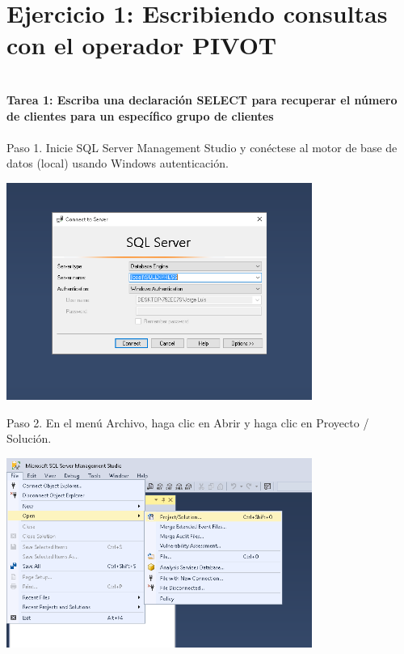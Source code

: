 \section{Ejercicio 1: Escribiendo consultas con el operador PIVOT} 
\textbf{}\\
\textbf{Tarea 1: Escriba una declaración SELECT para recuperar el número de clientes para un específico grupo de clientes}
\textbf{}\\
\textbf{}\\
Paso 1. Inicie SQL Server Management Studio y conéctese al motor de base de datos (local) usando Windows autenticación.

\begin{flushleft}

\begin{center}
	\includegraphics[width=10cm]{./Imagenes/img1} 
	\end{center}


Paso 2. En el menú Archivo, haga clic en Abrir y haga clic en Proyecto / Solución.

\begin{center}
	\includegraphics[width=10cm]{./Imagenes/img2} 
	\end{center}


\end{flushleft}
